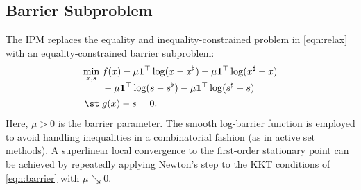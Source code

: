 \subsection{Barrier Subproblem}

The IPM replaces the equality and inequality-constrained problem in \eqref{eqn:relax} with an equality-constrained  barrier subproblem:
\begin{subequations}\label{eqn:barrier}
  \begin{align}
    \min_{x, s}\;
    &
      \begin{aligned}[t]
        &f(x) - \mu\boldsymbol{1}^\top \log (x- x^\flat) -\mu\boldsymbol{1}^\top \log (x^\sharp -x)\\
        &- \mu\boldsymbol{1}^\top \log (s- s^\flat) -\mu\boldsymbol{1}^\top \log (s^\sharp -s)
      \end{aligned}
          \label{eqn:barrier-obj}\\
    \st\;
    &g(x) - s = 0. \label{eqn:barrier-con}
  \end{align}
\end{subequations}
Here, $\mu>0$ is the barrier parameter. The smooth log-barrier
function is employed to avoid handling inequalities in a combinatorial
fashion (as in active set methods). A superlinear local convergence to
the first-order stationary point can be achieved by repeatedly
applying Newton's step to the KKT conditions of \eqref{eqn:barrier}
with $\mu\searrow 0 $.

